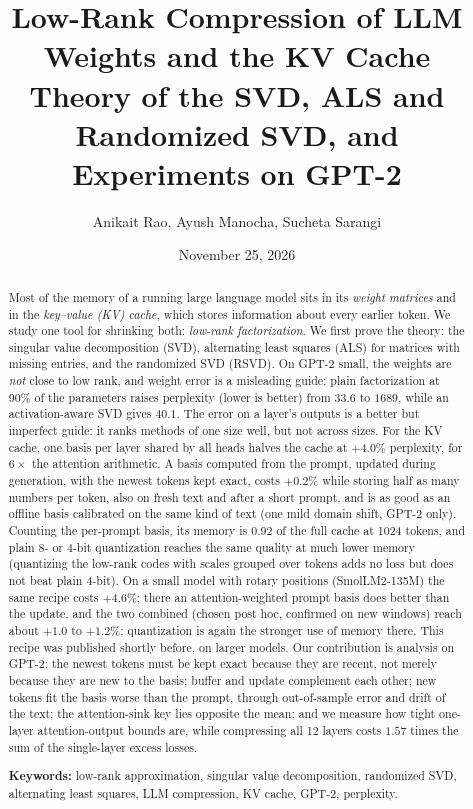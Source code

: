 \documentclass[10pt]{article}
\title{Low-Rank Compression of LLM Weights and the KV Cache\\[4pt]
\large Theory of the SVD, ALS and Randomized SVD, and Experiments on GPT-2}
\author{Anikait Rao, Ayush Manocha, Sucheta Sarangi}
\date{November 25, 2026}
\theoremstyle{plain}
\theoremstyle{definition}
\theoremstyle{remark}
\begin{document}
\maketitle

\begin{abstract}
\noindent Most of the memory of a running large language model sits in its \emph{weight matrices} and in the \emph{key--value (KV) cache}, which stores information about every earlier token. We study one tool for shrinking both: \emph{low-rank factorization}. We first prove the theory: the singular value decomposition (SVD), alternating least squares (ALS) for matrices with missing entries, and the randomized SVD (RSVD). On GPT-2 small, the weights are \emph{not} close to low rank, and weight error is a misleading guide: plain factorization at 90\% of the parameters raises perplexity (lower is better) from $33.6$ to $1689$, while an activation-aware SVD gives $40.1$. The error on a layer's outputs is a better but imperfect guide: it ranks methods of one size well, but not across sizes. For the KV cache, one basis per layer shared by all heads halves the cache at $+4.0\%$ perplexity, for $6\times$ the attention arithmetic. A basis computed from the prompt, updated during generation, with the newest tokens kept exact, costs $+0.2\%$ while storing half as many numbers per token, also on fresh text and after a short prompt, and is as good as an offline basis calibrated on the same kind of text (one mild domain shift, GPT-2 only). Counting the per-prompt basis, its memory is $0.92$ of the full cache at 1024 tokens, and plain 8- or 4-bit quantization reaches the same quality at much lower memory (quantizing the low-rank codes with scales grouped over tokens adds no loss but does not beat plain 4-bit). On a small model with rotary positions (SmolLM2-135M) the same recipe costs $+4.6\%$; there an attention-weighted prompt basis does better than the update, and the two combined (chosen post hoc, confirmed on new windows) reach about $+1.0$ to $+1.2\%$; quantization is again the stronger use of memory there. This recipe was published shortly before, on larger models. Our contribution is analysis on GPT-2: the newest tokens must be kept exact because they are recent, not merely because they are new to the basis; buffer and update complement each other; new tokens fit the basis worse than the prompt, through out-of-sample error and drift of the text; the attention-sink key lies opposite the mean; and we measure how tight one-layer attention-output bounds are, while compressing all 12 layers costs $1.57$ times the sum of the single-layer excess losses.
\par\medskip\noindent\textbf{Keywords:} low-rank approximation, singular value decomposition, randomized SVD, alternating least squares, LLM compression, KV cache, GPT-2, perplexity.
\end{abstract}
\end{document}
